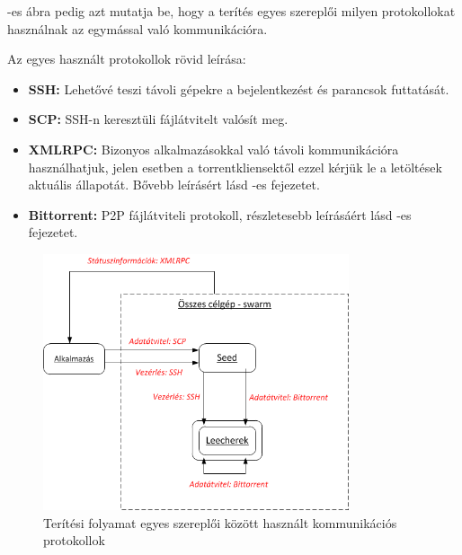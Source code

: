 -es ábra pedig azt mutatja be, hogy a terítés egyes szereplői milyen protokollokat használnak az egymással való kommunikációra.

Az egyes használt protokollok rövid leírása:

\begin{itemize}
  \item \textbf{SSH}\cite{ylonen2006secure}\textbf{:} Lehetővé teszi távoli gépekre a bejelentkezést és parancsok futtatását.
  \item \textbf{SCP}\cite{pechanec2007scp}\textbf{:} SSH-n keresztüli fájlátvitelt  valósít meg.
  \item \textbf{XMLRPC:} Bizonyos alkalmazásokkal való távoli kommunikációra használhatjuk, jelen esetben a torrentkliensektől ezzel kérjük le a letöltések aktuális állapotát. Bővebb leírásért lásd -es fejezetet.
  \item \textbf{Bittorrent:} P2P fájlátviteli protokoll, részletesebb leírásáért lásd -es fejezetet.
\end{itemize}

\begin{figure}[ht]
	\centering
	\includegraphics[width=90mm, keepaspectratio]{figures/design_protocols.png}
	\caption{Terítési folyamat egyes szereplői között használt kommunikációs protokollok}
	\label{fig:designprotocols}
\end{figure}

